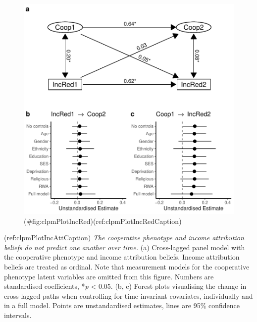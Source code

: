 \begin{appendix}
\begin{figure}
\centering
\includegraphics{manuscript_files/figure-latex/clpmPlotIncRed-1.pdf}
\caption{(\#fig:clpmPlotIncRed)(ref:clpmPlotIncRedCaption)}
\end{figure}

\newpage

(ref:clpmPlotIncAttCaption) \emph{The cooperative phenotype and income
attribution beliefs do not predict one another over time.} (a)
Cross-lagged panel model with the cooperative phenotype and income
attribution beliefs. Income attribution beliefs are treated as ordinal.
Note that measurement models for the cooperative phenotype latent
variables are omitted from this figure. Numbers are standardised
coefficients, *\emph{p} \textless{} 0.05. (b, c) Forest plots
visualising the change in cross-lagged paths when controlling for
time-invariant covariates, individually and in a full model. Points are
unstandardised estimates, lines are 95\% confidence intervals.


\end{appendix}

